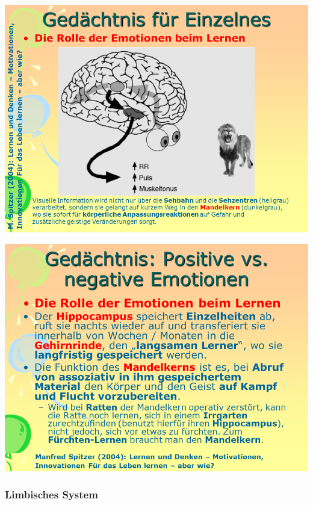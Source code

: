 \documentclass[
  letterpaper,
]{scrbook}
\begin{document}
\includegraphics[width=1\textwidth,height=\textheight]{./pictures/neuro/Diapozitiv59.PNG}

\includegraphics[width=1\textwidth,height=\textheight]{./pictures/neuro/Diapozitiv60.PNG}

\hypertarget{limbisches-system}{%
\subsubsection{Limbisches System}\label{limbisches-system}}
\end{document}
